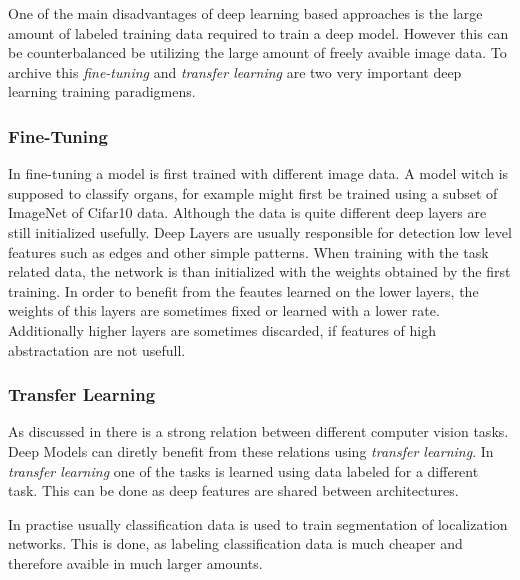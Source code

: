 One of the main disadvantages of deep learning based approaches is the large amount of labeled training data required to train a deep model. However this can be counterbalanced be utilizing the large amount of freely avaible image data. To archive this \emph{fine-tuning} and \emph{transfer learning}  are two very important deep learning training paradigmens.
 
\subsubsection{Fine-Tuning}

In fine-tuning a model is first trained with different image data. A model witch is supposed to classify organs, for example might first be trained using a subset of ImageNet of Cifar10 data. Although the data is quite different deep layers are still initialized usefully. Deep Layers are usually responsible for detection low level features such as edges and other simple patterns. 
When training with the task related data, the network is than initialized with the weights obtained by the first training. In order to benefit from the feautes learned on the lower layers, the weights of this layers are sometimes fixed or learned with a lower rate. Additionally higher layers are sometimes discarded, if features of high abstractation are not usefull. 


\subsubsection{Transfer Learning}

As discussed in  there is a strong relation between different computer vision tasks. Deep Models can diretly benefit from these relations using \emph{transfer learning}.
In \emph{transfer learning} one of the tasks is learned using data labeled for a different task. This can be done as deep features are shared between architectures. 

In practise usually classification data is used to train segmentation of localization networks. This is done, as labeling classification data is much cheaper and therefore avaible in much larger amounts. 






\label{sec:fully_connected}

